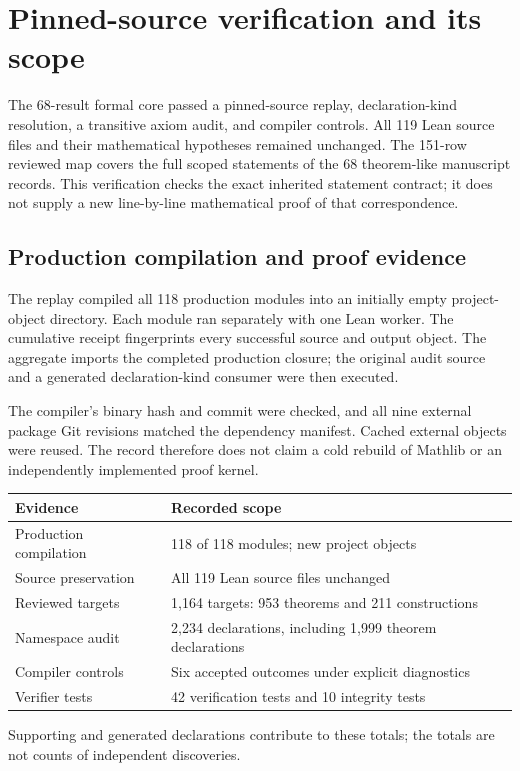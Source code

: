 \section{Pinned-source verification and its scope}
\label{sec:verification_scope}
The 68-result formal core passed a pinned-source replay, declaration-kind resolution, a transitive axiom audit, and compiler controls. All 119 Lean source files and their mathematical hypotheses remained unchanged. The 151-row reviewed map covers the full scoped statements of the 68 theorem-like manuscript records. This verification checks the exact inherited statement contract; it does not supply a new line-by-line mathematical proof of that correspondence.

\subsection{Production compilation and proof evidence}
The replay compiled all 118 production modules into an initially empty project-object directory. Each module ran separately with one Lean worker. The cumulative receipt fingerprints every successful source and output object. The aggregate imports the completed production closure; the original audit source and a generated declaration-kind consumer were then executed.

The compiler's binary hash and commit were checked, and all nine external package Git revisions matched the dependency manifest. Cached external objects were reused. The record therefore does not claim a cold rebuild of Mathlib or an independently implemented proof kernel.

\begin{longtable}{p{}p{}}
\toprule Evidence & Recorded scope \\ \midrule\endhead
Production compilation & 118 of 118 modules; new project objects \\
Source preservation & All 119 Lean source files unchanged \\
Reviewed targets & 1,164 targets: 953 theorems and 211 constructions \\
Namespace audit & 2,234 declarations, including 1,999 theorem declarations \\
Compiler controls & Six accepted outcomes under explicit diagnostics \\
Verifier tests & 42 verification tests and 10 integrity tests \\
\bottomrule
\end{longtable}
Supporting and generated declarations contribute to these totals; the totals are not counts of independent discoveries.

